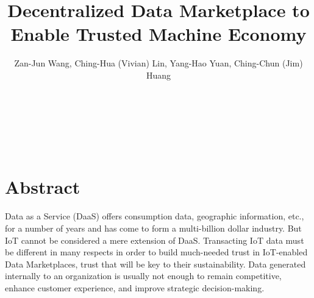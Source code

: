 \documentclass[journal,10pt,a4paper]{IEEEtran}
\begin{document}
\title{\Large\textbf{Decentralized Data Marketplace to Enable Trusted Machine Economy}}
\author{
    \large Zan-Jun Wang, Ching-Hua (Vivian) Lin, Yang-Hao Yuan, Ching-Chun (Jim) Huang

     \\
     \\
     \\

     \\

     \\

}

\maketitle
\section{\normalsize\textbf{Abstract}}
Data as a Service (DaaS) offers consumption data, geographic information, etc., for a number of years and has come to form a multi-billion dollar industry. But IoT cannot be considered a mere extension of DaaS. Transacting IoT data must be different in many respects in order to build much-needed trust in IoT-enabled Data Marketplaces, trust that will be key to their sustainability. Data generated internally to an organization is usually not enough to remain competitive, enhance customer experience, and improve strategic decision-making.
\end{document}
